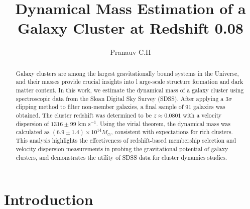 \documentclass[12pt]{article}
\title{\textbf{Dynamical Mass Estimation of a Galaxy Cluster at Redshift 0.08}}
\author{Pranauv C.H}
\date{}
\begin{document}
\maketitle

\begin{abstract}
Galaxy clusters are among the largest gravitationally bound systems in the Universe, and their masses provide crucial insights into l
arge-scale structure formation and dark matter content. In this work, we estimate the dynamical mass of a galaxy cluster using 
spectroscopic data from the Sloan Digital Sky Survey (SDSS). After applying a $3\sigma$ clipping method to filter non-member galaxies, 
a final sample of 91 galaxies was obtained. The cluster redshift was determined to be $z \approx 0.0801$ with a velocity dispersion 
of $1316 \pm 99$ km s$^{-1}$. Using the virial theorem, the dynamical mass was calculated as $(6.9 \pm 1.4) \times 10^{14} M_\odot$, 
consistent with expectations for rich clusters. This analysis highlights the effectiveness of redshift-based membership selection and 
velocity dispersion measurements in probing the gravitational potential of galaxy clusters, and demonstrates the utility of SDSS data 
for cluster dynamics studies.
\end{abstract}

\newpage
\tableofcontents

\newpage
\section{Introduction}
\end{document}
